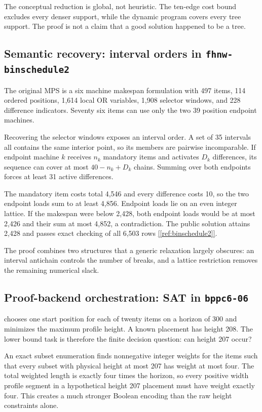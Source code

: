 \documentclass[11pt,letterpaper]{article}
\newcommand{\sourcecite}[1]{\hyperref[#1]{[\ref*{#1}]}}
\begin{document}
The conceptual reduction is global, not heuristic. The ten-edge cost bound excludes every denser support, while the dynamic program covers every tree support. The proof is not a claim that a good solution happened to be a tree.

\subsection{Semantic recovery: interval orders in \texttt{fhnw-binschedule2}}

The original MPS is a six machine makespan formulation with 497 items, 114 ordered positions, 1,614 local OR variables, 1,908 selector windows, and 228 difference indicators. Seventy six items can use only the two 39 position endpoint machines.

Recovering the selector windows exposes an interval order. A set of 35 intervals all contains the same interior point, so its members are pairwise incomparable. If endpoint machine \(k\) receives \(n_k\) mandatory items and activates \(D_k\) differences, its sequence can cover at most \(40-n_k+D_k\) chains. Summing over both endpoints forces at least 31 active differences.

The mandatory item costs total 4,546 and every difference costs 10, so the two endpoint loads sum to at least 4,856. Endpoint loads lie on an even integer lattice. If the makespan were below 2,428, both endpoint loads would be at most 2,426 and their sum at most 4,852, a contradiction. The public solution attains 2,428 and passes exact checking of all 6,503 rows \sourcecite{ref:binschedule2}.

The proof combines two structures that a generic relaxation largely obscures: an interval antichain controls the number of breaks, and a lattice restriction removes the remaining numerical slack.

\subsection{Proof-backend orchestration: SAT in \texttt{bppc6-06}}

\texttt{} chooses one start position for each of twenty items on a horizon of 300 and minimizes the maximum profile height. A known placement has height 208. The lower bound task is therefore the finite decision question: can height 207 occur?

An exact subset enumeration finds nonnegative integer weights for the items such that every subset with physical height at most 207 has weight at most four. The total weighted length is exactly four times the horizon, so every positive width profile segment in a hypothetical height 207 placement must have weight exactly four. This creates a much stronger Boolean encoding than the raw height constraints alone.
\end{document}
